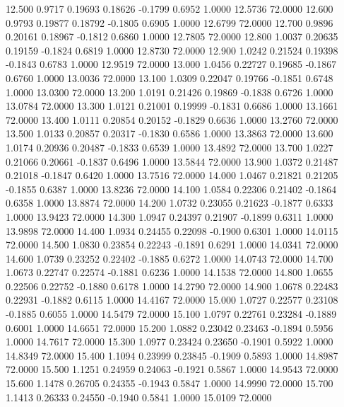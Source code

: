   12.500   0.9717   0.19693   0.18626  -0.1799   0.6952   1.0000  12.5736  72.0000
  12.600   0.9793   0.19877   0.18792  -0.1805   0.6905   1.0000  12.6799  72.0000
  12.700   0.9896   0.20161   0.18967  -0.1812   0.6860   1.0000  12.7805  72.0000
  12.800   1.0037   0.20635   0.19159  -0.1824   0.6819   1.0000  12.8730  72.0000
  12.900   1.0242   0.21524   0.19398  -0.1843   0.6783   1.0000  12.9519  72.0000
  13.000   1.0456   0.22727   0.19685  -0.1867   0.6760   1.0000  13.0036  72.0000
  13.100   1.0309   0.22047   0.19766  -0.1851   0.6748   1.0000  13.0300  72.0000
  13.200   1.0191   0.21426   0.19869  -0.1838   0.6726   1.0000  13.0784  72.0000
  13.300   1.0121   0.21001   0.19999  -0.1831   0.6686   1.0000  13.1661  72.0000
  13.400   1.0111   0.20854   0.20152  -0.1829   0.6636   1.0000  13.2760  72.0000
  13.500   1.0133   0.20857   0.20317  -0.1830   0.6586   1.0000  13.3863  72.0000
  13.600   1.0174   0.20936   0.20487  -0.1833   0.6539   1.0000  13.4892  72.0000
  13.700   1.0227   0.21066   0.20661  -0.1837   0.6496   1.0000  13.5844  72.0000
  13.900   1.0372   0.21487   0.21018  -0.1847   0.6420   1.0000  13.7516  72.0000
  14.000   1.0467   0.21821   0.21205  -0.1855   0.6387   1.0000  13.8236  72.0000
  14.100   1.0584   0.22306   0.21402  -0.1864   0.6358   1.0000  13.8874  72.0000
  14.200   1.0732   0.23055   0.21623  -0.1877   0.6333   1.0000  13.9423  72.0000
  14.300   1.0947   0.24397   0.21907  -0.1899   0.6311   1.0000  13.9898  72.0000
  14.400   1.0934   0.24455   0.22098  -0.1900   0.6301   1.0000  14.0115  72.0000
  14.500   1.0830   0.23854   0.22243  -0.1891   0.6291   1.0000  14.0341  72.0000
  14.600   1.0739   0.23252   0.22402  -0.1885   0.6272   1.0000  14.0743  72.0000
  14.700   1.0673   0.22747   0.22574  -0.1881   0.6236   1.0000  14.1538  72.0000
  14.800   1.0655   0.22506   0.22752  -0.1880   0.6178   1.0000  14.2790  72.0000
  14.900   1.0678   0.22483   0.22931  -0.1882   0.6115   1.0000  14.4167  72.0000
  15.000   1.0727   0.22577   0.23108  -0.1885   0.6055   1.0000  14.5479  72.0000
  15.100   1.0797   0.22761   0.23284  -0.1889   0.6001   1.0000  14.6651  72.0000
  15.200   1.0882   0.23042   0.23463  -0.1894   0.5956   1.0000  14.7617  72.0000
  15.300   1.0977   0.23424   0.23650  -0.1901   0.5922   1.0000  14.8349  72.0000
  15.400   1.1094   0.23999   0.23845  -0.1909   0.5893   1.0000  14.8987  72.0000
  15.500   1.1251   0.24959   0.24063  -0.1921   0.5867   1.0000  14.9543  72.0000
  15.600   1.1478   0.26705   0.24355  -0.1943   0.5847   1.0000  14.9990  72.0000
  15.700   1.1413   0.26333   0.24550  -0.1940   0.5841   1.0000  15.0109  72.0000

